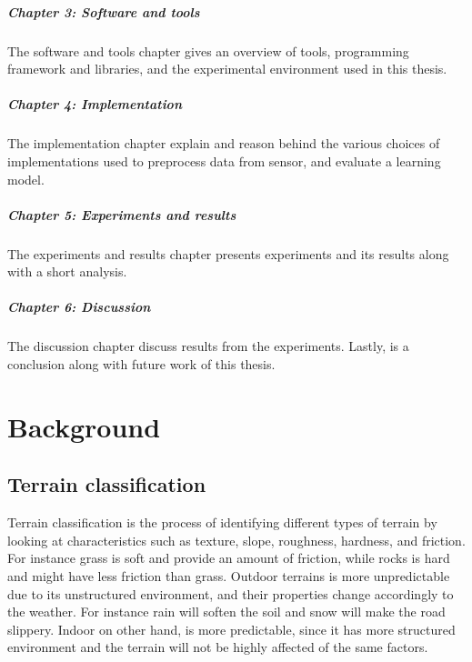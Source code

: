 \documentclass[USenglish]{ifimaster}  %
\begin{document}
\paragraph{Chapter 3: Software and tools}
The software and tools chapter gives an overview of tools, programming framework and libraries, and the experimental environment used in this thesis. 	

\paragraph{Chapter 4: Implementation}
The implementation chapter explain and reason behind the various choices of implementations used to preprocess data from sensor, and evaluate a learning model.
	
\paragraph{Chapter 5: Experiments and results}
The experiments and results chapter presents experiments and its results along with a short analysis.
	
\paragraph{Chapter 6: Discussion}
The discussion chapter discuss results from the experiments. Lastly, is a conclusion along with future work of this thesis. 
	
	
\chapter{Background}                  %
\section{Terrain classification}
Terrain classification is the process of identifying different types of terrain by looking at characteristics such as texture, slope, roughness, hardness, and friction. For instance grass is soft and provide an amount of friction, while rocks is hard and might have less friction than grass. Outdoor terrains is more unpredictable due to its unstructured environment, and their properties change accordingly to the weather. For instance rain will soften the soil and snow will make the road slippery. Indoor on other hand, is more predictable, since it has more structured environment and the terrain will not be highly affected of the same factors.
\end{document}
